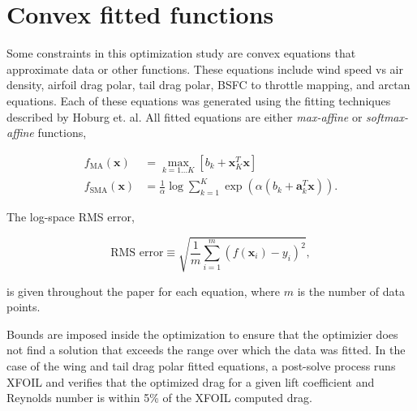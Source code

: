 
\chapter{Convex fitted functions} 

Some constraints in this optimization study are convex equations that approximate data or other functions.  
These equations include wind speed vs air density, airfoil drag polar, tail drag polar, BSFC to throttle mapping, and arctan equations.  
Each of these equations was generated using the fitting techniques described by Hoburg et. al.\cite{fitting} 
All fitted equations are either \emph{max-affine} or \emph{softmax-affine} functions,

\begin{align}
    f_{\text{MA}} (\bm{x}) &= \max\limits_{k=1 \dots K} [b_k + \bm{x}_K^T\bm{x}] \\
    f_{\text{SMA}} (\bm{x}) &= \frac{1}{\alpha} \log{\sum_{k=1}^K \exp{(\alpha(b_k + \bm{a}_k^T \bm{x}))}}.
\end{align}

The log-space RMS error, 

\begin{equation}
\text{RMS error} \equiv \sqrt{\frac{1}{m} \sum_{i=1}^m (f(\bm{x}_i) - y_i)^2},
\end{equation}

 is given throughout the paper for each equation, where $m$ is the number of data points. 

Bounds are imposed inside the optimization to ensure that the optimizier does not find a solution that exceeds the range over which the data was fitted.  In the case of the wing and tail drag polar fitted equations, a post-solve process runs XFOIL and verifies that the optimized drag for a given lift coefficient and Reynolds number is within 5\% of the XFOIL computed drag.
